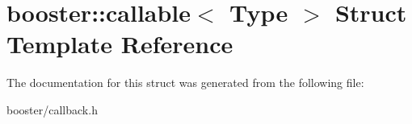 \section{booster\+:\+:callable$<$ Type $>$ Struct Template Reference}
\label{structbooster_1_1callable}


The documentation for this struct was generated from the following file\+:\begin{DoxyCompactItemize}
\item 
booster/callback.\+h\end{DoxyCompactItemize}
